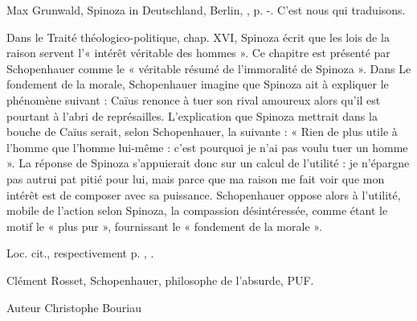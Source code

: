 Max Grunwald, Spinoza in Deutschland, Berlin, , p. -. C’est nous qui traduisons.

Dans le Traité théologico-politique, chap. XVI, Spinoza écrit que les lois de la raison servent l’« intérêt
véritable des hommes ». Ce chapitre est présenté par Schopenhauer comme le « véritable résumé de
l’immoralité de Spinoza ». Dans Le fondement de la morale, Schopenhauer
imagine que Spinoza ait à expliquer le phénomène suivant : Caïus renonce à tuer son rival amoureux alors
qu’il est pourtant à l’abri de représailles. L’explication que Spinoza mettrait dans la bouche de Caïus serait,
selon Schopenhauer, la suivante : « Rien de plus utile à l’homme que l’homme lui-même : c’est pourquoi je
n’ai pas voulu tuer un homme ». La réponse de Spinoza s’appuierait donc sur un calcul de l’utilité :
je n’épargne pas autrui pat pitié pour lui, mais parce que ma raison me fait voir que mon intérêt est de
composer avec sa puissance. Schopenhauer oppose alors à l’utilité, mobile de l’action selon Spinoza, la
compassion désintéressée, comme étant le motif le « plus pur », fournissant le « fondement de la morale ».

Loc. cit., respectivement p. , .

Clément Rosset, Schopenhauer, philosophe de l’absurde, PUF.

Auteur
Christophe Bouriau
